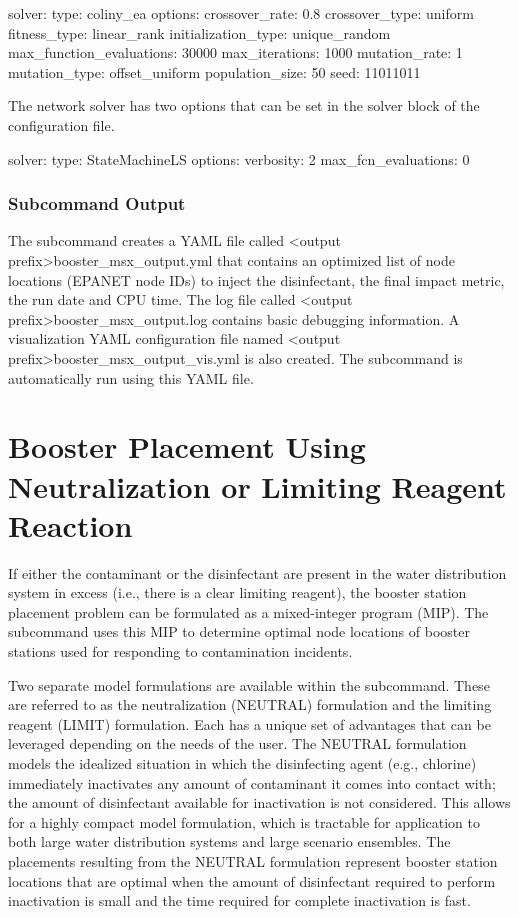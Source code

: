 \begin{unknownListing}
solver:
  type: coliny_ea
  options: 
    crossover_rate: 0.8
    crossover_type: uniform
    fitness_type: linear_rank
    initialization_type: unique_random
    max_function_evaluations: 30000
    max_iterations: 1000
    mutation_rate: 1
    mutation_type: offset_uniform
    population_size: 50
    seed: 11011011
\end{unknownListing}

The network solver has two options that can be set in the solver block of the configuration file. 
\begin{unknownListing}
solver:  
  type: StateMachineLS
  options:
    verbosity: 2
    max_fcn_evaluations: 0
\end{unknownListing}

\subsubsection{Subcommand Output}
The  subcommand creates a YAML file called <output prefix>booster\_msx\_output.yml 
that contains an optimized list of node locations (EPANET node IDs) to inject the disinfectant,
the final impact metric, the run date and CPU time. 
The log file called <output prefix>booster\_msx\_output.log contains basic debugging information.
A visualization YAML configuration file named <output prefix>booster\_msx\_output\_vis.yml is also created.
The  subcommand is automatically run using this YAML file.

\section{Booster Placement Using Neutralization or Limiting Reagent Reaction}\label{booster_mip_formulations}

If either the contaminant or the disinfectant are present in the water distribution system in 
excess (i.e., there is a clear limiting reagent), the booster station placement problem can 
be formulated as a mixed-integer program (MIP). The  subcommand uses this MIP to determine 
optimal node locations of booster stations used for responding to contamination incidents. 

Two separate model formulations are available within the  subcommand. 
These are referred to as the neutralization (NEUTRAL) formulation and 
the limiting reagent (LIMIT) formulation. Each has a unique set of advantages 
that can be leveraged depending on the needs of the user. 
The NEUTRAL formulation models the idealized situation in which 
the disinfecting agent (e.g., chlorine) immediately inactivates any amount of 
contaminant it comes into contact with; the amount of disinfectant available for 
inactivation is not considered. This allows for a highly compact model 
formulation, which is tractable for application to both large water distribution 
systems and large scenario ensembles. The placements resulting from the NEUTRAL 
formulation represent booster station locations that are optimal 
when the amount of disinfectant required to perform inactivation is small and 
the time required for complete inactivation is fast. 

